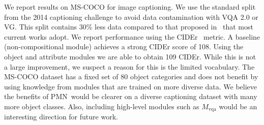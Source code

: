\documentclass{article}
\def\PMN{PMN}
\def\Mvqa{M_\mathrm{vqa}}
\begin{document}
\label{tbl:objatt_table}%
We report results on MS-COCO for image captioning.
We use the standard split from the 2014 captioning challenge to avoid data contamination with VQA 2.0 or VG.
This split contains 30\% less data compared to that proposed in~\citet{karpathy15} that most current works adopt.
We report performance using the CIDEr~\citep{vedantam15} metric.
A baseline (non-compositional module) achieves a strong CIDEr score of 108.
Using the object and attribute modules we are able to obtain 109 CIDEr.
While this is not a large improvement, we suspect a reason for this is the limited vocabulary.
The MS-COCO dataset has a fixed set of 80 object categories and does not benefit by using knowledge from modules that are trained on more diverse data.
We believe the benefits of  \PMN~would be clearer on a diverse captioning dataset with many more object classes.
Also, including high-level modules such as $\Mvqa$ would be an interesting direction for future work.
\end{document}

